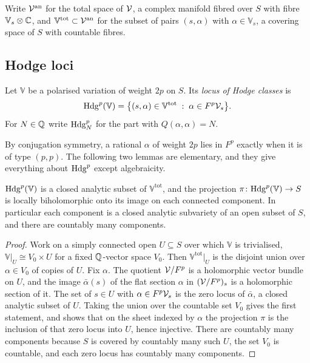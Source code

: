 \begin{notation}\label{not:totalspace}
Write $\mathcal{V}^{\mathrm{an}}$ for the total space of $\mathcal{V}$, a complex manifold
fibred over $S$ with fibre $\mathbb{V}_{s}\otimes\mathbb{C}$, and
$\mathbb{V}^{\mathrm{tot}}\subset\mathcal{V}^{\mathrm{an}}$ for the subset of pairs
$(s,\alpha)$ with $\alpha\in\mathbb{V}_{s}$, a covering space of $S$ with
countable fibres.
\end{notation}

\subsection{Hodge loci}

\begin{definition}\label{def:hodgelocus}
Let $\mathbb{V}$ be a polarised variation of weight $2p$ on $S$. Its
\emph{locus of Hodge classes} is
\[
  \mathrm{Hdg}^{p}(\mathbb{V})
  =\bigl\{(s,\alpha)\in\mathbb{V}^{\mathrm{tot}}\;:\;
     \alpha\in F^{p}\mathcal{V}_{s}\bigr\}.
\]
For $N\in\mathbb{Q}$ write $\mathrm{Hdg}^{p}_{N}$ for the part with $Q(\alpha,\alpha)=N$.
\end{definition}

By conjugation symmetry, a rational $\alpha$ of weight $2p$ lies in $F^{p}$
exactly when it is of type $(p,p)$. The following two lemmas are elementary,
and they give everything about $\mathrm{Hdg}^{p}$ except algebraicity.

\begin{lemma}[Analyticity]\label{lem:hodgeanalytic}
$\mathrm{Hdg}^{p}(\mathbb{V})$ is a closed analytic subset of
$\mathbb{V}^{\mathrm{tot}}$, and the projection
$\pi\colon\mathrm{Hdg}^{p}(\mathbb{V})\to S$ is locally biholomorphic onto its image on
each connected component. In particular each component is a closed analytic
subvariety of an open subset of $S$, and there are countably many components.
\end{lemma}

\begin{proof}
Work on a simply connected open $U\subseteq S$ over which $\mathbb{V}$ is
trivialised, $\mathbb{V}|_{U}\cong V_{0}\times U$ for a fixed $\mathbb{Q}$-vector
space $V_{0}$. Then $\mathbb{V}^{\mathrm{tot}}|_{U}$ is the disjoint union over
$\alpha\in V_{0}$ of copies of $U$. Fix $\alpha$. The quotient
$\mathcal{V}/F^{p}$ is a holomorphic vector bundle on $U$, and the image
$\bar\alpha(s)$ of the flat section $\alpha$ in $(\mathcal{V}/F^{p})_{s}$ is a
holomorphic section of it. The set of $s\in U$ with $\alpha\in F^{p}\mathcal{V}_{s}$
is the zero locus of $\bar\alpha$, a closed analytic subset of $U$. Taking
the union over the countable set $V_{0}$ gives the first statement, and shows
that on the sheet indexed by $\alpha$ the projection $\pi$ is the inclusion of
that zero locus into $U$, hence injective. There are countably many
components because $S$ is covered by countably many such $U$, the set $V_{0}$
is countable, and each zero locus has countably many components.
\end{proof}

